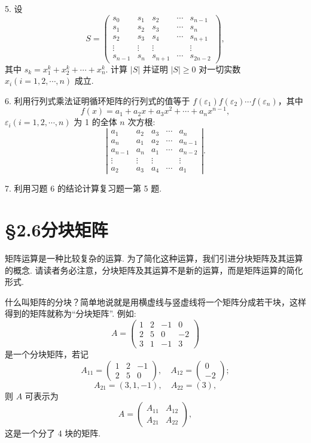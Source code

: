 \documentclass[UTF8,12pt,a4paper,fontset=fandol]{ctexart}
\begin{document}
5. 设
\[
S=\left(\begin{array}{ccccc}
s_0 & s_1 & s_2 & \cdots & s_{n-1}\\
s_1 & s_2 & s_3 & \cdots & s_n\\
s_2 & s_3 & s_4 & \cdots & s_{n+1}\\
\vdots & \vdots & \vdots & & \vdots\\
s_{n-1} & s_n & s_{n+1} & \cdots & s_{2n-2}
\end{array}\right),
\]
其中 $s_k=x_1^k+x_2^k+\cdots+x_n^k$. 计算 $|S|$ 并证明 $|S|\ge 0$ 对一切实数 $x_i(i=1,2,\cdots,n)$ 成立.

6. 利用行列式乘法证明循环矩阵的行列式的值等于 $f(\varepsilon_1)f(\varepsilon_2)\cdots f(\varepsilon_n)$，其中
\[
f(x)=a_1+a_2x+a_3x^2+\cdots+a_nx^{n-1},
\]
$\varepsilon_i(i=1,2,\cdots,n)$ 为 1 的全体 $n$ 次方根:
\[
\left|\begin{array}{ccccc}
a_1 & a_2 & a_3 & \cdots & a_n\\
a_n & a_1 & a_2 & \cdots & a_{n-1}\\
a_{n-1} & a_n & a_1 & \cdots & a_{n-2}\\
\vdots & \vdots & \vdots & & \vdots\\
a_2 & a_3 & a_4 & \cdots & a_1
\end{array}\right|.
\]

7. 利用习题 6 的结论计算复习题一第 5 题.

\section*{§2.6\quad 分块矩阵}

矩阵运算是一种比较复杂的运算. 为了简化这种运算，我们引进分块矩阵及其运算的概念. 请读者务必注意，分块矩阵及其运算不是新的运算，而是矩阵运算的简化形式.

什么叫矩阵的分块？简单地说就是用横虚线与竖虚线将一个矩阵分成若干块，这样得到的矩阵就称为“分块矩阵”. 例如:
\[
A=\left(\begin{array}{ccc|c}
1 & 2 & -1 & 0\\
2 & 5 & 0 & -2\\ \hline
3 & 1 & -1 & 3
\end{array}\right)
\]
是一个分块矩阵，若记
\[
A_{11}=\left(\begin{array}{rrr}
1 & 2 & -1\\
2 & 5 & 0
\end{array}\right),\quad
A_{12}=\left(\begin{array}{r}
0\\
-2
\end{array}\right);
\]
\[
A_{21}=(3,1,-1),\quad A_{22}=(3),
\]
则 $A$ 可表示为
\[
A=\left(\begin{array}{cc}
A_{11} & A_{12}\\
A_{21} & A_{22}
\end{array}\right),
\]
这是一个分了 4 块的矩阵.
\end{document}

